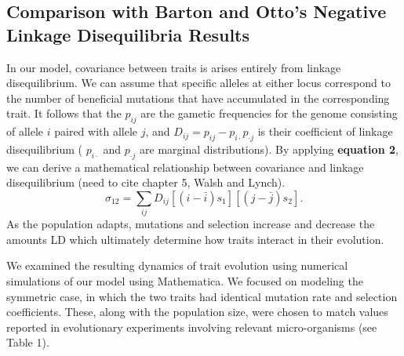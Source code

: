 \documentclass[11pt,twocolumn]{article}
\begin{document}
\subsection{Comparison with Barton and Otto's Negative Linkage Disequilibria Results}
In our model, covariance between traits is arises entirely from linkage disequilibrium. We can assume that specific alleles at either locus correspond to the number of beneficial mutations that have accumulated in the corresponding trait.  It follows that the $p_{ij}$ are the gametic frequencies for the genome consisting of allele $i$ paired with allele $j$, and $D_{ij} = p_{ij}-p_{i\cdot} p_{\cdot j}$ is their coefficient of linkage disequilibrium ( $p_{i\cdot}$ and $p_{\cdot j}$ are marginal distributions). By applying \textbf{equation 2}, we can derive a mathematical relationship between covariance and linkage disequilibrium (need to cite chapter 5, Walsh and Lynch).
% 
% 
\begin{equation}
\sigma_{12}=\sum_{ij}D_{ij}[(i-\bar{i})s_1][(j-\bar{j})s_2]. 
\end{equation} 
As the population adapts, mutations and selection  increase and decrease the amounts LD which ultimately determine how traits interact in their evolution.\par

We examined the resulting dynamics of trait evolution using numerical simulations of our model using Mathematica. We focused on modeling the symmetric case, in which the two traits had identical mutation rate and selection coefficients. These, along with the population size, were chosen to match values reported in evolutionary experiments involving relevant micro-organisms (see Table 1). 




\end{document}
